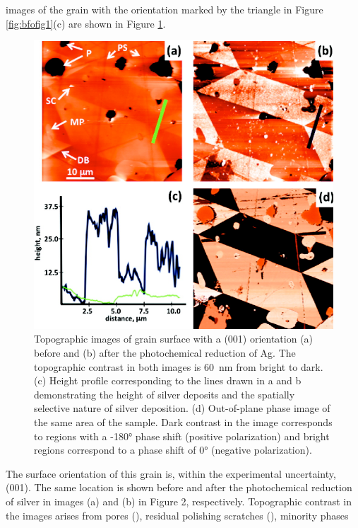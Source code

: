  images of the grain with the orientation marked by the triangle in Figure
\ref{fig:bfofig1}(c) are shown in Figure \ref{fig:bfofig2}.
\begin{figure}
	\includegraphics[width=\textwidth]{bfofig2.pdf}
	\caption[Topographic  images of  grain surface]{%
		Topographic  images of  grain surface 
		with a (001) orientation (a) before and (b) after the 
		photochemical reduction of Ag. The topographic contrast 
		in both images is \SI{60}{\nano\meter} from bright to 
		dark. (c) Height profile corresponding to the lines drawn 
		in a and b demonstrating the height of silver deposits 
		and the spatially selective nature of silver deposition. 
		(d) Out-of-plane  phase image of the same area of the 
		sample. Dark contrast in the image corresponds to regions 
		with a -180\si{\degree} phase shift (positive polarization) 
		and bright regions correspond to a phase shift of 0\si{\degree} 
		(negative polarization).}
	\label{fig:bfofig2}
\end{figure}
The surface orientation of this grain is, within the experimental uncertainty, (001). The
same location is shown before and after the photochemical reduction of silver in images
(a) and (b) in Figure 2, respectively. Topographic contrast in the  images
arises from pores (), residual polishing scratches (), minority phases
